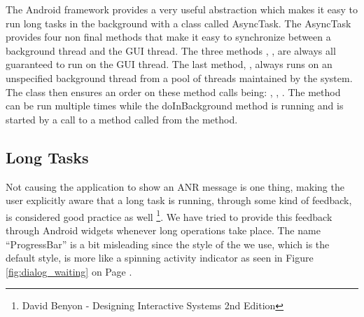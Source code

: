 The Android framework provides a very useful abstraction which makes it easy to run long tasks in the background with a class called AsyncTask. The AsyncTask provides four non final methods that make it easy to synchronize between a background thread and the GUI thread. The three methods , ,  are always all guaranteed to run on the GUI thread. The last method, , always runs on an unspecified background thread from a pool of threads maintained by the system. The class then ensures an order on these method calls being: , , . The  method can be run multiple times while the doInBackground method is running and is started by a call to a method called  from the  method.  

\subsection{Long Tasks}

Not causing the application to show an ANR message is one thing, making the user explicitly aware that a long task is running, through some kind of feedback, is considered good practice as well \footnote{David Benyon - Designing Interactive Systems 2nd Edition}. We have tried to provide this feedback through Android  widgets whenever long operations take place. The name ``ProgressBar'' is a bit misleading since the style of the  we use, which is the default style, is more like a spinning activity indicator as seen in Figure \ref{fig:dialog_waiting} on Page \pageref{fig:dialog_waiting}. 